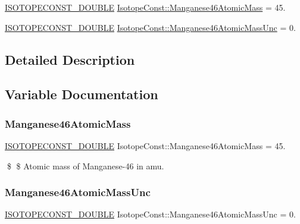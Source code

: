 \begin{DoxyCompactItemize}
\item 
\mbox{\hyperlink{group___isotope_const-_macros_ga8f45a7272ce02c0b4c65c44636ed719a}{I\+S\+O\+T\+O\+P\+E\+C\+O\+N\+S\+T\+\_\+\+D\+O\+U\+B\+LE}} \mbox{\hyperlink{group___isotope_const-_manganese-_mn46_ga4c9fec884fd6e193c2db91f1ddfa9751}{Isotope\+Const\+::\+Manganese46\+Atomic\+Mass}} = 45.
\item 
\mbox{\hyperlink{group___isotope_const-_macros_ga8f45a7272ce02c0b4c65c44636ed719a}{I\+S\+O\+T\+O\+P\+E\+C\+O\+N\+S\+T\+\_\+\+D\+O\+U\+B\+LE}} \mbox{\hyperlink{group___isotope_const-_manganese-_mn46_ga8e337c8ee95b3119747d17eafcbb3877}{Isotope\+Const\+::\+Manganese46\+Atomic\+Mass\+Unc}} = 0.
\end{DoxyCompactItemize}


\subsection{Detailed Description}


\subsection{Variable Documentation}
\mbox{\label{group___isotope_const-_manganese-_mn46_ga4c9fec884fd6e193c2db91f1ddfa9751}} 
\subsubsection{\texorpdfstring{Manganese46\+Atomic\+Mass}{Manganese46AtomicMass}}
{\footnotesize\ttfamily \mbox{\hyperlink{group___isotope_const-_macros_ga8f45a7272ce02c0b4c65c44636ed719a}{I\+S\+O\+T\+O\+P\+E\+C\+O\+N\+S\+T\+\_\+\+D\+O\+U\+B\+LE}} Isotope\+Const\+::\+Manganese46\+Atomic\+Mass = 45.}

\$ \$ Atomic mass of Manganese-\/46 in amu. \mbox{\label{group___isotope_const-_manganese-_mn46_ga8e337c8ee95b3119747d17eafcbb3877}} 
\subsubsection{\texorpdfstring{Manganese46\+Atomic\+Mass\+Unc}{Manganese46AtomicMassUnc}}
{\footnotesize\ttfamily \mbox{\hyperlink{group___isotope_const-_macros_ga8f45a7272ce02c0b4c65c44636ed719a}{I\+S\+O\+T\+O\+P\+E\+C\+O\+N\+S\+T\+\_\+\+D\+O\+U\+B\+LE}} Isotope\+Const\+::\+Manganese46\+Atomic\+Mass\+Unc = 0.}

